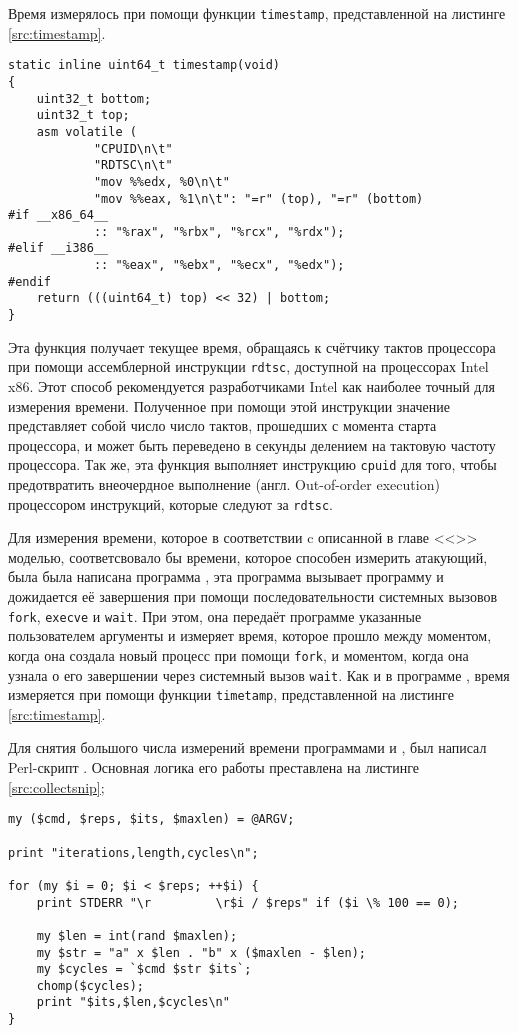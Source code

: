 Время измерялось при помощи функции \texttt{timestamp}, представленной на листинге
\ref{src:timestamp}.

\begin{lstlisting}[caption=Функция \texttt{timestamp}, label=src:timestamp]
static inline uint64_t timestamp(void)
{
	uint32_t bottom;
	uint32_t top;
	asm volatile (
			"CPUID\n\t"
			"RDTSC\n\t"
			"mov %%edx, %0\n\t"
			"mov %%eax, %1\n\t": "=r" (top), "=r" (bottom)
#if __x86_64__
			:: "%rax", "%rbx", "%rcx", "%rdx");
#elif __i386__
			:: "%eax", "%ebx", "%ecx", "%edx");
#endif
	return (((uint64_t) top) << 32) | bottom;
}
\end{lstlisting}

Эта функция получает текущее время, обращаясь к счётчику тактов процессора при
помощи ассемблерной инструкции \texttt{rdtsc}, доступной на процессорах Intel x86.
Этот способ рекомендуется разработчиками Intel \cite{rdtsc} как наиболее точный для измерения
времени. Полученное при помощи этой инструкции значение представляет собой число
число тактов, прошедших с момента старта процессора, и может быть переведено в
секунды делением на тактовую частоту процессора. Так же, эта функция выполняет инструкцию
\texttt{cpuid} для того, чтобы предотвратить внеочердное выполнение
(англ. Out-of-order execution) процессором инструкций, которые следуют за \texttt{rdtsc}.

Для измерения времени, которое в соответствии c описанной в главе <<>>
моделью, соответсвовало бы времени, которое способен измерить атакующий, была
была написана программа , эта программа вызывает программу
 и дожидается её завершения при помощи последовательности системных
вызовов \texttt{fork}, \texttt{execve} и \texttt{wait}. При этом, она передаёт
программе  указанные пользователем аргументы и измеряет время, которое
прошло между моментом, когда она создала новый процесс при помощи \texttt{fork},
и моментом, когда она узнала о его завершении через системный вызов \texttt{wait}.
Как и в программе , время измеряется при помощи функции \texttt{timetamp},
представленной на листинге \ref{src:timestamp}.

Для снятия большого числа измерений времени программами  и
, был написал Perl-скрипт . Основная логика его
работы преставлена на листинге \ref{src:collectsnip};

\begin{lstlisting}[caption=Фрагмент скрипта \texttt{collect.pl}, label=src:collectsnip]
my ($cmd, $reps, $its, $maxlen) = @ARGV;

print "iterations,length,cycles\n";

for (my $i = 0; $i < $reps; ++$i) {
	print STDERR "\r         \r$i / $reps" if ($i \% 100 == 0);

	my $len = int(rand $maxlen);
	my $str = "a" x $len . "b" x ($maxlen - $len);
	my $cycles = `$cmd $str $its`;
	chomp($cycles);
	print "$its,$len,$cycles\n"
}
\end{lstlisting}


